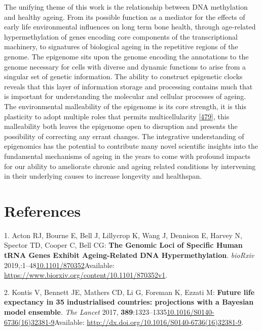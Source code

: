 \documentclass[
]{book}
\begin{document}
The unifying theme of this work is the relationship between DNA methylation and healthy ageing.
From its possible function as a mediator for the effects of early life environmental influences on long term bone health, through age-related hypermethylation of genes encoding core components of the transcriptional machinery, to signatures of biological ageing in the repetitive regions of the genome.
The epigenome sits upon the genome encoding the annotations to the genome necessary for cells with diverse and dynamic functions to arise from a singular set of genetic information.
The ability to construct epigenetic clocks reveals that this layer of information storage and processing contains much that is important for understanding the molecular and cellular processes of ageing.
The environmental malleability of the epigenome is its core strength, it is this plasticity to adopt multiple roles that permits multicellularity {[}\protect\hyperlink{ref-Tudge2016}{479}{]}, this malleability both leaves the epigenome open to disruption and presents the possibility of correcting any errant changes.
The integrative understanding of epigenomics has the potential to contribute many novel scientific insights into the fundamental mechanisms of ageing in the years to come with profound impacts for our ability to ameliorate chronic and ageing related conditions by intervening in their underlying causes to increase longevity and healthspan.

\hypertarget{references}{%
\chapter*{References}\label{references}}

\hypertarget{refs}{}
\leavevmode\hypertarget{ref-Acton2020}{}%
1. Acton RJ, Bourne E, Bell J, Lillycrop K, Wang J, Dennison E, Harvey N, Spector TD, Cooper C, Bell CG: \textbf{The Genomic Loci of Specific Human tRNA Genes Exhibit Ageing-Related DNA Hypermethylation}. \emph{bioRxiv} 2019,:1--48\href{https://doi.org/10.1101/870352}{10.1101/870352}Available: \url{https://www.biorxiv.org/content/10.1101/870352v1}.

\leavevmode\hypertarget{ref-Kontis2017}{}%
2. Kontis V, Bennett JE, Mathers CD, Li G, Foreman K, Ezzati M: \textbf{Future life expectancy in 35 industrialised countries: projections with a Bayesian model ensemble}. \emph{The Lancet} 2017, \textbf{389}:1323--1335\href{https://doi.org/10.1016/S0140-6736(16)32381-9}{10.1016/S0140-6736(16)32381-9}Available: \url{http://dx.doi.org/10.1016/S0140-6736(16)32381-9}.
\end{document}
